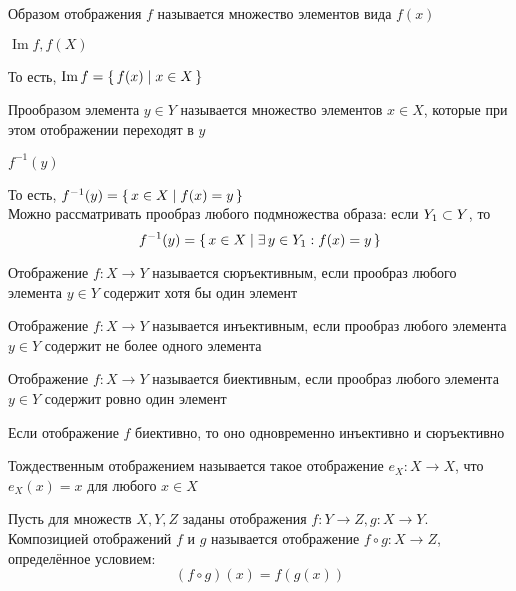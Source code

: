 \begin{definition}
	Образом отображения $f$ называется множество элементов вида $f(x)$
	\begin{notation}
		$\operatorname{Im} f, f(X)$
	\end{notation}
	То есть, $\operatorname{Im} f = \set{f(x) | x \in X}$
\end{definition}

\begin{definition}
	Прообразом элемента $y \in Y$ называется множество элементов $x \in X$, которые при этом отображении переходят в $y$
	\begin{notation}
		$f^{-1}(y)$
	\end{notation}
	То есть, $f^{-1}(y) = \set{x \in X | f(x) = y}$ \\
	Можно рассматривать прообраз любого подмножества образа: если $Y_1 \subset Y$, то
	$$ f^{-1}(y) = \set{x \in X | \exists\,y \in Y_1 : f(x) = y} $$
\end{definition}

\begin{definition}
	Отображение $f : X \to Y$ называется сюръективным, если прообраз любого элемента $y \in Y$ содержит хотя бы один элемент
\end{definition}

\begin{definition}
	Отображение $f : X \to Y$ называется инъективным, если прообраз любого элемента $y \in Y$ содержит не более одного элемента
\end{definition}

\begin{definition}
	Отображение $f : X \to Y$ называется биективным, если прообраз любого элемента $y \in Y$ содержит ровно один элемент
\end{definition}

\begin{note}
	Если отображение $f$ биективно, то оно одновременно инъективно и сюръективно
\end{note}

\begin{definition}
	Тождественным отображением называется такое отображение $e_X : X \to X$, что $e_X(x) = x$ для любого $x \in X$
\end{definition}

\begin{definition}
	Пусть для множеств $X, Y, Z$ заданы отображения $f : Y \to Z, g : X \to Y$. Композицией отображений $f$ и $g$ называется отображение $f \circ g : X \to Z$, определённое условием:
	$$ (f \circ g)(x) = f(g(x)) $$
\end{definition}

